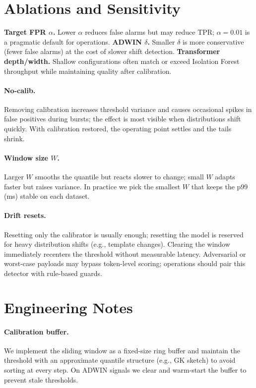 \documentclass[10pt,twocolumn]{article}
\begin{document}
\section{Ablations and Sensitivity}

\textbf{Target FPR $\alpha$.} Lower $\alpha$ reduces false alarms but may reduce TPR; $\alpha{=}0.01$ is a pragmatic default for operations.
\textbf{ADWIN $\delta$.} Smaller $\delta$ is more conservative (fewer false alarms) at the cost of slower shift detection.
\textbf{Transformer depth/width.} Shallow configurations often match or exceed Isolation Forest throughput while maintaining quality after calibration.
\paragraph{No-calib.} Removing calibration increases threshold variance and causes occasional spikes in false positives during bursts; the effect is most visible when distributions shift quickly. With calibration restored, the operating point settles and the tails shrink.
\paragraph{Window size $W$.} Larger $W$ smooths the quantile but reacts slower to change; small $W$ adapts faster but raises variance. In practice we pick the smallest $W$ that keeps the p99 (ms) stable on each dataset.
\paragraph{Drift resets.} Resetting only the calibrator is usually enough; resetting the model is reserved for heavy distribution shifts (e.g., template changes). Clearing the window immediately recenters the threshold without measurable latency.
Adversarial or worst-case payloads may bypass token-level scoring; operations should pair this detector with rule-based guards.
\section{Engineering Notes}
\paragraph{Calibration buffer.} We implement the sliding window as a fixed-size ring buffer and maintain the threshold with an approximate quantile structure (e.g., GK sketch) to avoid sorting at every step. On ADWIN signals we clear and warm-start the buffer to prevent stale thresholds.
\end{document}
